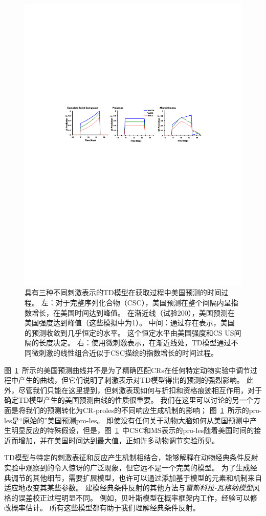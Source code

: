 {\begin{figure}[!htb]
	\centering
	\includegraphics[width=0.8\linewidth]{chap11/fig_11_6}
	\caption{具有三种不同刺激表示的TD模型在获取过程中美国预测的时间过程。
		左：对于完整序列化合物（CSC），美国预测在整个间隔内呈指数增长，在美国时间达到峰值。
		在渐近线（试验200），美国预测在美国强度达到峰值（这些模拟中为1）。
		中间：通过存在表示，美国的预测收敛到几乎恒定的水平。
		这个恒定水平由美国强度和CS US间隔的长度决定。
		右：使用微刺激表示，在渐近线处，TD模型通过不同微刺激的线性组合近似于CSC描绘的指数增长的时间过程。\label{fig:11_6}}
\end{figure}
			
			
图~\ref{fig:11_6}~所示的美国预测曲线并不是为了精确匹配CRs在任何特定动物实验中调节过程中产生的曲线，但它们说明了刺激表示对TD模型得出的预测的强烈影响。
此外，尽管我们只能在这里提到，但刺激表现如何与折扣和资格痕迹相互作用，对于确定TD模型产生的美国预测曲线的性质很重要。
我们在这里可以讨论的另一个方面是将我们的预测转化为CR-proles的不同响应生成机制的影响；
图~\ref{fig:11_6}~所示的pro-les是“原始的”美国预测pro-les。
即使没有任何关于动物大脑如何从美国预测中产生明显反应的特殊假设，但是，图~\ref{fig:11_6}~中CSC和MS表示的pro-les随着美国时间的接近而增加，并在美国时间达到最大值，正如许多动物调节实验所见。


TD模型与特定的刺激表征和反应产生机制相结合，能够解释在动物经典条件反射实验中观察到的令人惊讶的广泛现象，但它远不是一个完美的模型。
为了生成经典调节的其他细节，需要扩展模型，也许可以通过添加基于模型的元素和机制来自适应地改变其某些参数。
建模经典条件反射的其他方法与\textit{雷斯科拉-瓦格纳模型}风格的误差校正过程明显不同。
例如，贝叶斯模型在概率框架内工作，经验可以修改概率估计。
所有这些模型都有助于我们理解经典条件反射。


}
